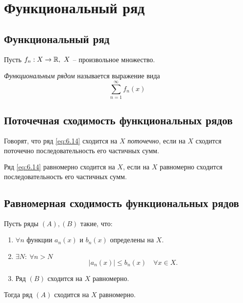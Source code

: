 \section{Функциональный ряд}

\setcounter{subsection}{76}

\subsection{Функциональный ряд}

\begin{definition}
    Пусть $f_n: X \rightarrow\mathbb{R}, \ X$ -- произвольное множество.

    \emph{Функциональным рядом} называется выражение вида
    \begin{equation}\label{eq:6.14}
        \sum_{n=1}^{\infty}f_n(x)
    \end{equation}
\end{definition}

\subsection{Поточечная сходимость функциональных рядов}

\begin{note}
    Говорят, что ряд \ref{eq:6.14} сходится на $X$ \emph{поточечно}, если на $X$ сходится поточечно последовательность его частичных сумм.
    
    Ряд \ref{eq:6.14} {равномерно} сходится на $X$, если на $X$ равномерно сходится последовательность его частичных сумм.
\end{note}

\subsection{Равномерная сходимость функциональных рядов}

\begin{theorem}
    Пусть ряды $ (A),(B) $ такие, что:
    \begin{enumerate}
        \item $\forall n$ функции $a_n(x)$ и $b_n(x)$ определены на $X$.
        \item $\exists N: \ \forall n > N$
              \[
                  \big|a_n(x)\big| \leqslant b_n(x) \quad \forall x \in X.
              \]
        \item Ряд $(B)$ сходится на $X$ равномерно.
    \end{enumerate}

    Тогда ряд $(A)$ сходится на $X$ равномерно.
\end{theorem}

